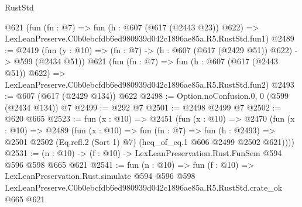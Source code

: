 \begin{lexlean}{RustStd}
\begin{coremodule}
    @621
    (fun (fn : @7) =>
    fun (h : @607 (@617 (@2443 @23)) @622) =>
    LexLeanPreserve.C0b0ebcfdb6ed980939d042c1896ae85a.R5.RustStd.fun1)
@2489 := @2419
    (fun (y : @10) => (fn : @7) -> (h : @607 (@617 (@2429 @51)) @622) -> @599 (@2434 @51))
    @621
    (fun (fn : @7) =>
    fun (h : @607 (@617 (@2443 @51)) @622) =>
    LexLeanPreserve.C0b0ebcfdb6ed980939d042c1896ae85a.R5.RustStd.fun2)
@2493 := @607 (@617 (@2429 @134)) @622
@2498 := Option.noConfusion.{0, 0} (@599 (@2434 @134)) @7
@2499 := @292 @7
@2501 := @2498 @2499 @7
@2502 := @620 @665
@2523 := fun (x : @10) =>
  @2451
    (fun (x : @10) =>
    @2470
      (fun (x : @10) =>
      @2489
        (fun (x : @10) =>
        fun (fn : @7) =>
        fun (h : @2493) =>
        @2501 @2502 (Eq.refl.{2} (Sort 1) @7) (heq_of_eq.{1} @606 @2499 @2502 @621))))
@2531 := (n : @10) -> (f : @10) -> LexLeanPreservation.Rust.FunSem @594 @596 @598 @665 @621
@2541 := fun (n : @10) =>
  fun (f : @10) =>
  LexLeanPreservation.Rust.simulate
    @594
    @596
    @598
    LexLeanPreserve.C0b0ebcfdb6ed980939d042c1896ae85a.R5.RustStd.crate_ok
    @665
    @621
\end{coremodule}
\end{lexlean}
